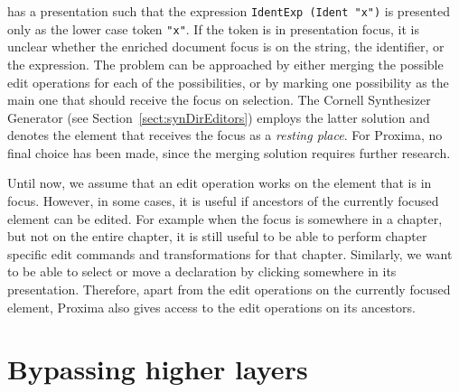 has a presentation such that the expression \verb|IdentExp (Ident "x")| is presented only as the lower case token \verb|"x"|. If the token is in presentation focus, it is unclear whether the enriched document focus is on the string, the identifier, or the expression. The problem can be approached by either merging the possible edit operations for each of the possibilities, or by marking one possibility as the main one that should receive the focus on selection. The Cornell Synthesizer Generator (see Section~\ref{sect:synDirEditors}) employs the latter solution and denotes the element that receives the focus as a {\em resting place}. For Proxima, no final choice has been made, since the merging solution requires further research.





Until now, we assume that an edit operation works on the element that is in focus. However, in some cases, it is useful if ancestors of the currently focused element can be edited. For example when the focus is somewhere in a chapter, but not on the entire chapter, it is still useful to be able to perform chapter specific edit commands and transformations for that chapter. Similarly, we want to be able to select or move a declaration by clicking somewhere in its presentation. Therefore, apart from the edit operations on the currently focused element, Proxima also gives access to the edit operations on its ancestors. 


%									
%									
%									
\section{Bypassing higher layers} \label{sect:bypassingLayers}


